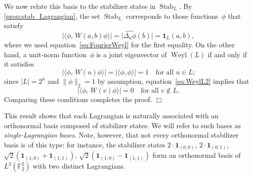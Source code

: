 \documentclass[11pt]{amsart}
\DeclareMathOperator{\Stab}{Stab}\DeclareMathOperator{\Spec}{Spec}
\newcommand{\F}{\mathbb{F}} %
\newcommand{\one}{\mathbf{1}}
\DeclareMathOperator{\Weyl}{Weyl}
\theoremstyle{plain}
\theoremstyle{definition}
\theoremstyle{remark}
\renewenvironment{proof}[1][]{
    	\begin{trivlist}
     	\item[\hspace{\labelsep}{\em\noindent Proof#1:\/}]}
     	{{\hfill$\Box$}
    	\end{trivlist}
  }
\begin{document}
\begin{proof}
We now relate this basis to the stabilizer states in $\Stab_L$.
By \cref{prop:stab_Lagrangian}, the set $\Stab_L$ corresponds to those functions~$\phi$ that satisfy
$$|\langle\phi,\, W(a,b)\phi\rangle| = \big|\widehat{\Delta_a\phi}(b)\big| = \one_{L}(a,b),$$
where we used equation~\eqref{eq:FourierWeyl} for the first equality.
On the other hand, a unit-norm function~$\phi$ is a joint eigenvector of $\Weyl(L)$ if and only if it satisfies
$$|\langle\phi,\, W(u)\phi\rangle| = |\langle\phi, \phi\rangle| = 1 \quad \text{for all $u\in L$;}$$
since $|L| = 2^n$ and $\|\phi\|_2 = 1$ by assumption, equation~\eqref{eq:WeylL2} implies that
$$|\langle\phi,\, W(v)\phi\rangle| = 0 \quad \text{for all $v\notin L$.}$$
Comparing these conditions completes the proof.
\end{proof}

This result shows that each Lagrangian is naturally associated with an orthonormal basis composed of stabilizer states.
We will refer to such bases as \emph{single-Lagrangian bases}.
Note, however, that not every orthonormal stabilizer basis is of this type:
for instance, the stabilizer states $2\cdot \one_{(0,0)}$, $2\cdot \one_{(0,1)}$, $\sqrt{2} (\one_{(1,0)}+ \one_{(1,1)})$, $\sqrt{2} (\one_{(1,0)}- \one_{(1,1)})$ form an orthonormal basis of $L^2(\F_2^2)$ with two distinct Lagrangians.
\end{document}
